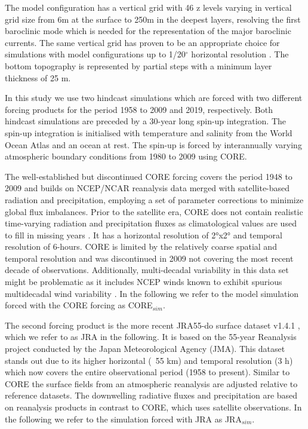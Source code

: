 \documentclass[os, manuscript]{copernicus}
\begin{document}
The model configuration has a vertical grid with 46 z levels varying in vertical grid size from 6m at the surface to 250m in the deepest layers, resolving the first baroclinic mode \citep{Stewart2017,Schubert2019} which is needed for the representation of the major baroclinic currents. The same vertical grid has proven to be an appropriate choice for simulations with model configurations up to 1/20$^{\circ}$ horizontal resolution \cite[e.g.][]{Boning2016,Behrens2017}. The bottom topography is represented by partial steps \citep{Barnier2006} with a minimum layer thickness of 25 m.

In this study we use two hindcast simulations which are forced with two different forcing products for the period 1958 to 2009 and 2019, respectively. Both hindcast simulations are preceded by a 30-year long spin-up integration. The spin-up integration is initialised with temperature and salinity from the World Ocean Atlas \cite[][with modifications in the polar regions from PHC; \citealp{Steele2001}]{Levitus1998} and an ocean at rest. The spin-up is forced by interannually varying atmospheric boundary conditions from 1980 to 2009 using CORE. 

The well-established but discontinued CORE forcing covers the period 1948 to 2009 \citep{Griffies2009} and builds on NCEP/NCAR reanalysis data merged with satellite-based radiation and precipitation, employing a set of parameter corrections to minimize global flux imbalances. Prior to the satellite era, CORE does not contain realistic time-varying radiation and precipitation fluxes as climatological values are used to fill in missing years \citep{Large2009}. It has a horizontal resolution of 2°x2° and temporal resolution of 6-hours. CORE is limited by the relatively coarse spatial and temporal resolution and was discontinued  in 2009 not covering the most recent decade of observations. Additionally, multi-decadal variability in this data set might be problematic as it includes NCEP winds known to exhibit spurious multidecadal wind variability \citep{Fiorino,He2016,Hurrell1998}. In the following we  refer to the model simulation forced with the CORE forcing as CORE$ _{sim} $.

The second forcing product is the more recent JRA55-do surface dataset v1.4.1 \citep{Tsujino2018}, which we  refer to as JRA in the following. It is based on the 55-year Reanalysis project \cite[JRA-55; e.g.][]{Kobayashi2015} conducted by the Japan Meteorological Agency (JMA). This dataset stands out due to its higher horizontal (~55 km) and temporal resolution (3 h) which now covers the entire observational period (1958 to present). Similar to CORE the surface fields from an atmospheric reanalysis are adjusted relative to reference datasets. The downwelling radiative fluxes and precipitation are based on reanalysis products in contrast to CORE, which uses satellite observations. In the following we  refer to the simulation forced with JRA as JRA$ _{sim} $.
\end{document}
